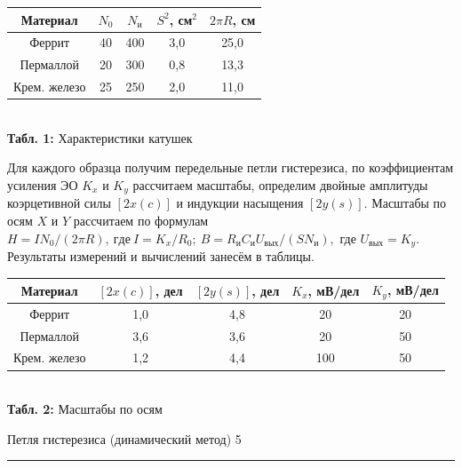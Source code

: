 \documentclass[12pt,a4paper]{scrartcl}
\begin{document}
\begin{center}
	\begin{tabular}{|c|c|c|c|c|}
		\hline
		Материал     & $N_0$ & $N_\text{и}$ & $S^2$, см$^2$ & $2\pi R$, см \\ \hline
		Феррит       & 40    & 400                              & 3,0           & 25,0         \\ \hline
		Пермаллой    & 20    & 300                              & 0,8           & 13,3         \\ \hline
		Крем. железо & 25    & 250                              & 2,0           & 11,0         \\ \hline
	\end{tabular}
	\\\textbf{Табл. 1:} Характеристики катушек
\end{center}
	
Для каждого образца получим передельные петли гистерезиса, по коэффициентам усиления ЭО $K_x$ и $K_y$ рассчитаем масштабы, определим двойные амплитуды коэрцетивной силы $ [2x(c)] $ и индукции насыщения $ [2y(s)] $. Масштабы по осям $ X $ и $ Y $ рассчитаем по формулам 
$H=IN_0/(2\pi R),\ где\ I=K_x/R_0;\ B=R_\text{и}C_\text{и}U_{\text{вых}}/(SN_\text{и}),$ где $U_{\text{вых}}=K_y$. Результаты измерений и вычислений занесём в таблицы.

\begin{center}
	\begin{tabular}{|c|c|c|c|c|}
		\hline
		Материал     & $[2x(c)]$, дел & $[2y(s)]$, дел & $K_x$, мВ/дел & $K_y$, мВ/дел \\ \hline
		Феррит       & 1,0            & 4,8            & 20            & 20            \\ \hline
		Пермаллой    & 3,6            & 3,6            & 20            & 50            \\ \hline
		Крем. железо & 1,2            & 4,4            & 100           & 50            \\ \hline
	\end{tabular}
	\\\textbf{Табл. 2:} Масштабы по осям
\end{center}	
	
	\newpage
	
	
	\begin{flushleft}
		\footnotesize{Петля гистерезиса (динамический метод)} \hspace{\fill} \footnotesize{5}
		\\[-0.3cm]\noindent\rule{\textwidth}{0.3pt}
	\end{flushleft}	
	
\end{document}
